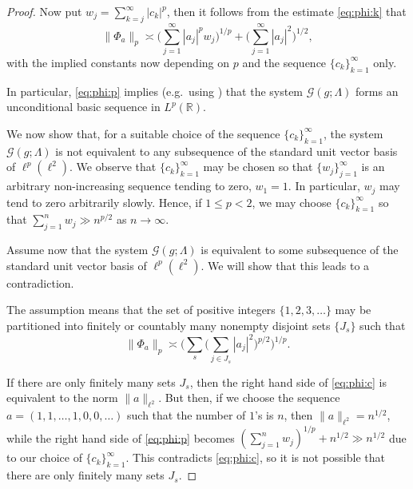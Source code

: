 \documentclass[reqno,a4paper,12pt]{amsart}
\numberwithin{equation}{section}
\numberwithin{figure}{section}
\newcommand\R{\mathbb{R}}
\newcommand\G{\mathcal{G}}
\newcommand\1{\mathds{1}}
\renewcommand\le{\leqslant}
\theoremstyle{plain}
\theoremstyle{definition}
\begin{document}
\begin{proof}
Now put $w_j = \sum_{k=j}^\infty |c_k|^p$, then it follows from the estimate \eqref{eq:phi:k} that
\begin{equation}
\label{eq:phi:p}
\|\Phi_a\|_p \asymp \Big( \sum_{j=1}^\infty |a_j|^p w_j \Big)^{1/p} + \Big(\sum_{j=1}^\infty |a_j|^2\Big)^{1/2},
\end{equation}
with the implied constants now depending on $p$ and the sequence $\{c_k\}_{k=1}^{\infty}$ only.

In particular, \eqref{eq:phi:p} implies (e.g.\ using \cite[Propositions 1.1.9 and 3.1.3]{AK16}) that the system  $\G(g;\Lambda)$ forms an unconditional basic sequence in $L^p(\R)$.


We now show that, for a suitable choice of the sequence $\{c_k\}_{k=1}^{\infty}$, the system $\G(g;\Lambda)$ is not equivalent to any subsequence of the standard unit vector basis of $\ell^p(\ell^2)$. We observe that $\{c_k\}_{k=1}^{\infty}$ may be chosen so that $\{w_j\}_{j=1}^{\infty}$ is an arbitrary non-increasing sequence tending to zero, $w_1 = 1$. In particular,
$w_j$ may tend to zero arbitrarily slowly. Hence, if $1 \le p < 2$, we may choose $\{c_k\}_{k=1}^{\infty}$ so that $\sum_{j=1}^{n} w_j \gg n^{p/2}$ as $n \to \infty$.

Assume now that the system $\G(g;\Lambda)$ is equivalent to some subsequence of the standard unit vector basis of $\ell^p(\ell^2)$. We will show that this leads to a contradiction.

The assumption means that the set of positive integers $\{1,2,3,\dots\}$ may be partitioned into finitely or countably many nonempty disjoint sets $\{J_s\}$ such that
\begin{equation}
\label{eq:phi:c}
\|\Phi_a\|_p \asymp \Big( \sum_{s} \Big(\sum_{j \in J_s} |a_j|^2\Big)^{p/2} \Big)^{1/p}.
\end{equation}

If there are only finitely many sets $J_s$, then the right hand side of \eqref{eq:phi:c} is equivalent to the norm $\|a\|_{\ell^2}$. But then, if we choose the sequence
$a=(1,1,\dots,1,0,0,\dots)$ such that the number of $1$'s is $n$, then $\|a\|_{\ell^2} = n^{1/2}$, while
the right hand side of \eqref{eq:phi:p}
becomes $ ( \sum_{j=1}^n w_j )^{1/p} + n^{1/2} \gg n^{1/2}$ due to our choice of $\{c_k\}_{k=1}^{\infty}$. 
This contradicts \eqref{eq:phi:c}, so it is not possible that there are only finitely many sets $J_s$.


\end{proof}
\end{document}

